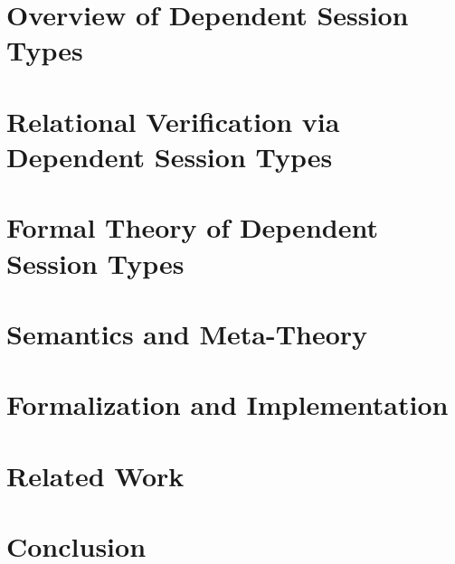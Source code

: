 \documentclass[acmsmall,10pt,anonymous]{acmart}
\begin{document}
\section{Overview of Dependent Session Types}\label{sec:overview}


\section{Relational Verification via Dependent Session Types}\label{sec:relational}


\section{Formal Theory of Dependent Session Types}\label{sec:theory}


\section{Semantics and Meta-Theory}\label{sec:semantics}


\section{Formalization and Implementation}\label{sec:formalization}
\section{Related Work}\label{sec:related}
\section{Conclusion}\label{sec:conclusion}


\end{document}
